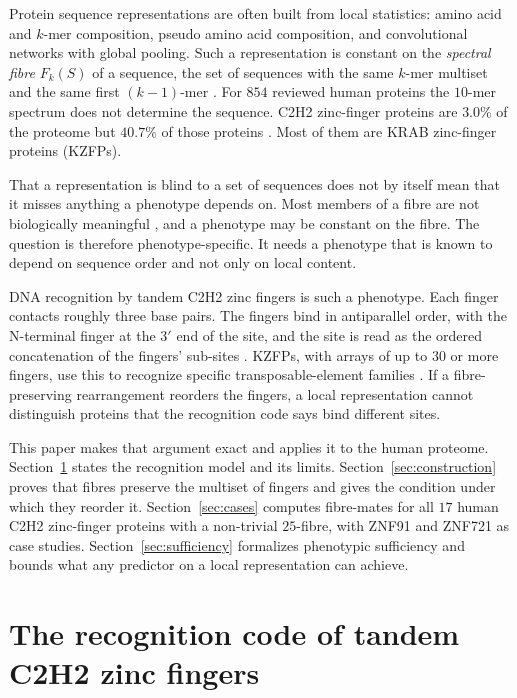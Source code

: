 \documentclass[11pt]{article}
\theoremstyle{plain}
\theoremstyle{definition}
\theoremstyle{remark}
\begin{document}
Protein sequence representations are often built from local statistics: amino acid and $k$-mer composition,
pseudo amino acid composition, and convolutional networks with global pooling. Such a representation is
constant on the \emph{spectral fibre} $F_k(S)$ of a sequence, the set of sequences with the same $k$-mer
multiset and the same first $(k-1)$-mer \cite{CC26a,CC26b,CC26d}. For $854$ reviewed human proteins the
$10$-mer spectrum does not determine the sequence. C2H2 zinc-finger proteins are $3.0\%$ of the proteome but
$40.7\%$ of those proteins \cite{CC26b}. Most of them are KRAB zinc-finger proteins (KZFPs).

That a representation is blind to a set of sequences does not by itself mean that it misses anything a
phenotype depends on. Most members of a fibre are not biologically meaningful \cite{CC26e}, and a phenotype
may be constant on the fibre. The question is therefore phenotype-specific. It needs a phenotype that is known
to depend on sequence order and not only on local content.

DNA recognition by tandem C2H2 zinc fingers is such a phenotype. Each finger contacts roughly three base pairs.
The fingers bind in antiparallel order, with the N-terminal finger at the $3'$ end of the site, and the site is
read as the ordered concatenation of the fingers' sub-sites \cite{PavletichPabo91,Wolfe00}. KZFPs, with arrays of
up to $30$ or more fingers, use this to recognize specific transposable-element families
\cite{Imbeault17,Jacobs14}. If a fibre-preserving rearrangement reorders the fingers, a local representation
cannot distinguish proteins that the recognition code says bind different sites.

This paper makes that argument exact and applies it to the human proteome. Section~\ref{sec:code} states the
recognition model and its limits. Section~\ref{sec:construction} proves that fibres preserve the multiset of
fingers and gives the condition under which they reorder it. Section~\ref{sec:cases} computes fibre-mates for
all $17$ human C2H2 zinc-finger proteins with a non-trivial $25$-fibre, with ZNF91 and ZNF721 as case studies.
Section~\ref{sec:sufficiency} formalizes phenotypic sufficiency and bounds what any predictor on a local
representation can achieve.

\section{The recognition code of tandem C2H2 zinc fingers}\label{sec:code}
\end{document}
